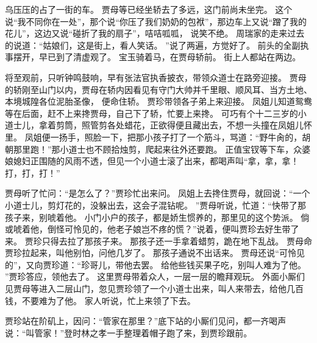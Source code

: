 乌压压的占了一街的车。
贾母等已经坐轿去了多远，这门前尚未坐完。
这个说“我不同你在一处”，那个说“你压了我们奶奶的包袱”，那边车上又说“蹭了我的花儿”，这边又说“碰折了我的扇子”，咭咭呱呱，
说笑不绝。
周瑞家的走来过去的说道：“姑娘们，这是街上，看人笑话。
”说了两遍，方觉好了。
前头的全副执事摆开，早已到了清虚观了。
宝玉骑着马，在贾母轿前。
街上人都站在两边。
\par
将至观前，只听钟鸣鼓响，早有张法官执香披衣，带领众道士在路旁迎接。
贾母的轿刚至山门以内，贾母在轿内因看见有守门大帅并千里眼、顺风耳、当方土地、
本境城隍各位泥胎圣像，
便命住轿。
贾珍带领各子弟上来迎接。
凤姐儿知道鸳鸯等在后面，赶不上来搀贾母，自己下了轿，忙要上来搀。
可巧有个十二三岁的小道士儿，拿着剪筒，照管剪各处蜡花，正欲得便且藏出去，不想一头撞在凤姐儿怀里。
凤姐便一扬手，照脸一下，把那小孩子打了一个筋斗，骂道：“野牛肏的，胡朝那里跑！”那小道士也不顾拾烛剪，爬起来往外还要跑。
正值宝钗等下车，众婆娘媳妇正围随的风雨不透，但见一个小道士滚了出来，都喝声叫“拿，拿，拿！打，打，打！”\par
贾母听了忙问：“是怎么了？”贾珍忙出来问。
凤姐上去搀住贾母，就回说：“一个小道士儿，剪灯花的，没躲出去，这会子混钻呢。
”贾母听说，忙道：“快带了那孩子来，别唬着他。
小门小户的孩子，都是娇生惯养的，那里见的这个势派。
倘或唬着他，倒怪可怜见的，他老子娘岂不疼的慌？”说着，便叫贾珍去好生带了来。
贾珍只得去拉了那孩子来。
那孩子还一手拿着蜡剪，跪在地下乱战。
贾母命贾珍拉起来，叫他别怕，问他几岁了。
那孩子通说不出话来。
贾母还说“可怜见的”，又向贾珍道：“珍哥儿，带他去罢。
给他些钱买果子吃，别叫人难为了他。
”贾珍答应，领他去了。
这里贾母带着众人，一层一层的瞻拜观玩。
外面小厮们见贾母等进入二层山门，忽见贾珍领了一个小道士出来，叫人来带去，给他几百钱，不要难为了他。
家人听说，忙上来领了下去。
\par
贾珍站在阶矶上，因问：“管家在那里？”底下站的小厮们见问，都一齐喝声说：“叫管家！”登时林之孝一手整理着帽子跑了来，到贾珍跟前。

